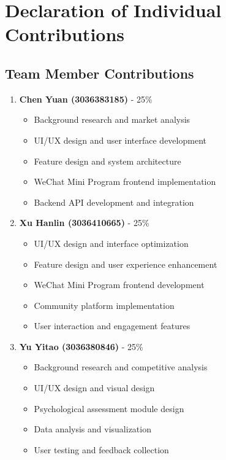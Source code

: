 \appendix

\section{Declaration of Individual Contributions}
\label{sec:contributions}

\subsection{Team Member Contributions}

\begin{enumerate}
    \item \textbf{Chen Yuan (3036383185)} - 25\%
    \begin{itemize}
        \item Background research and market analysis
        \item UI/UX design and user interface development
        \item Feature design and system architecture
        \item WeChat Mini Program frontend implementation
        \item Backend API development and integration
    \end{itemize}
    
    \item \textbf{Xu Hanlin (3036410665)} - 25\%
    \begin{itemize}
        \item UI/UX design and interface optimization
        \item Feature design and user experience enhancement
        \item WeChat Mini Program frontend development
        \item Community platform implementation
        \item User interaction and engagement features
    \end{itemize}
    
    \item \textbf{Yu Yitao (3036380846)} - 25\%
    \begin{itemize}
        \item Background research and competitive analysis
        \item UI/UX design and visual design
        \item Psychological assessment module design
        \item Data analysis and visualization
        \item User testing and feedback collection
    \end{itemize}
    

\end{enumerate}
